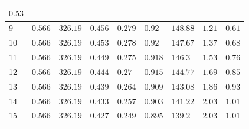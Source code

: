 \documentclass[a4paper,12pt]{article}
\begin{document}
\begin{longtable}{|p{0.6cm}|p{1.2cm}|p{1.2cm}|p{1.2cm}|p{1.2cm}|p{1.2cm}|p{1.2cm}|p{1.2cm}|p{1.3cm}|}
        $0.53$ \\ \hline
%        
        9 & $0.566$ & $326.19$ &
        $0.456$ &
        $0.279$ & $0.92$ &
        $148.88$ & $1.21$ &
        $0.61$ \\ \hline
%        
        10 & $0.566$ & $326.19$ &
        $0.453$ &
        $0.278$ & $0.92$ &
        $147.67$ & $1.37$ &
        $0.68$ \\ \hline
%        
        11 & $0.566$ & $326.19$ &
        $0.449$ &
        $0.275$ & $0.918$ &
        $146.3$ & $1.53$ &
        $0.76$ \\ \hline
%        
        12 & $0.566$ & $326.19$ &
        $0.444$ &
        $0.27$ & $0.915$ &
        $144.77$ & $1.69$ &
        $0.85$ \\ \hline
%        
        13 & $0.566$ & $326.19$ &
        $0.439$ &
        $0.264$ & $0.909$ &
        $143.08$ & $1.86$ &
        $0.93$ \\ \hline
%        
        14 & $0.566$ & $326.19$ &
        $0.433$ &
        $0.257$ & $0.903$ &
        $141.22$ & $2.03$ &
        $1.01$ \\ \hline
%        
        15 & $0.566$ & $326.19$ &
        $0.427$ &
        $0.249$ & $0.895$ &
        $139.2$ & $2.03$ &
        $1.01$ \\ \hline
%        
    \end{longtable}
\end{document}
